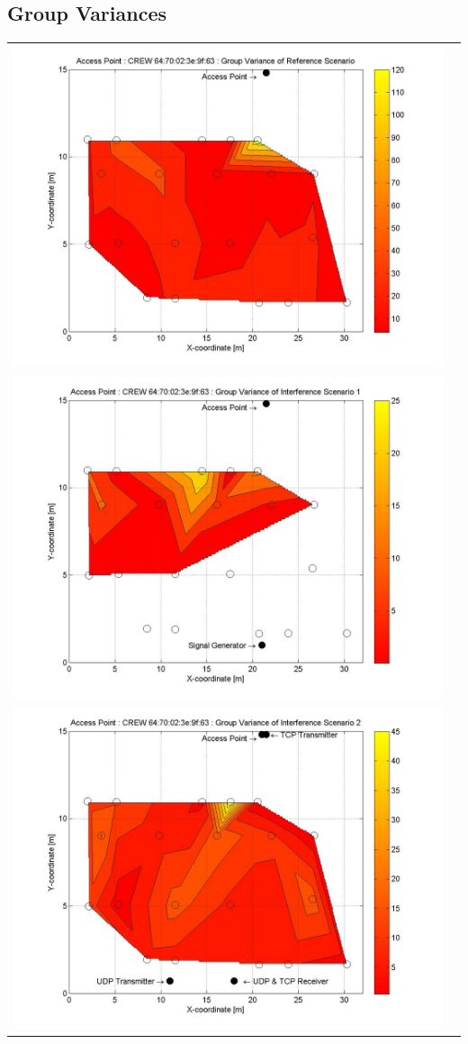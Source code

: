 \documentclass[11pt,a4paper,headinclude,footinclude,chapterprefix=on]{scrreprt}
\begin{document}
\subsection{Group Variances} 
\begin{longtable}
	{lr} 
	\includegraphics[width=13cm]{../../Source/plot/CREW_63/63_Ref_Group_Variance.jpg} \\
	\includegraphics[width=13cm]{../../Source/plot/CREW_63/63_Sig_Group_Variance.jpg} \\
	\includegraphics[width=13cm]{../../Source/plot/CREW_63/63_Wifi_Group_Variance.jpg} \\

\end{longtable}
\end{document}
